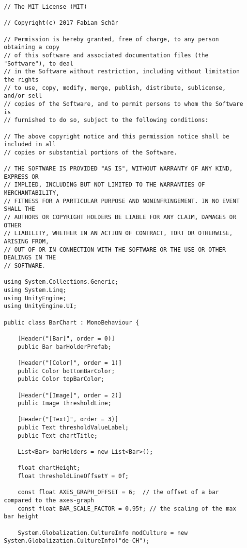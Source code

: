 \begin{lstlisting}[caption={/Assets/Scripts/Charts/BarChart.cs}, label={lst:scripts_charts_barchart}]
// The MIT License (MIT)

// Copyright(c) 2017 Fabian Schär

// Permission is hereby granted, free of charge, to any person obtaining a copy
// of this software and associated documentation files (the "Software"), to deal
// in the Software without restriction, including without limitation the rights
// to use, copy, modify, merge, publish, distribute, sublicense, and/or sell
// copies of the Software, and to permit persons to whom the Software is
// furnished to do so, subject to the following conditions:

// The above copyright notice and this permission notice shall be included in all
// copies or substantial portions of the Software.

// THE SOFTWARE IS PROVIDED "AS IS", WITHOUT WARRANTY OF ANY KIND, EXPRESS OR
// IMPLIED, INCLUDING BUT NOT LIMITED TO THE WARRANTIES OF MERCHANTABILITY,
// FITNESS FOR A PARTICULAR PURPOSE AND NONINFRINGEMENT. IN NO EVENT SHALL THE
// AUTHORS OR COPYRIGHT HOLDERS BE LIABLE FOR ANY CLAIM, DAMAGES OR OTHER
// LIABILITY, WHETHER IN AN ACTION OF CONTRACT, TORT OR OTHERWISE, ARISING FROM,
// OUT OF OR IN CONNECTION WITH THE SOFTWARE OR THE USE OR OTHER DEALINGS IN THE
// SOFTWARE.

using System.Collections.Generic;
using System.Linq;
using UnityEngine;
using UnityEngine.UI;

public class BarChart : MonoBehaviour {

	[Header("[Bar]", order = 0)]
	public Bar barHolderPrefab;
	
	[Header("[Color]", order = 1)]
	public Color bottomBarColor;
	public Color topBarColor;
	
	[Header("[Image]", order = 2)]
	public Image thresholdLine;
	
	[Header("[Text]", order = 3)]
	public Text thresholdValueLabel;
	public Text chartTitle;
	
	List<Bar> barHolders = new List<Bar>();
	
	float chartHeight;
	float thresholdLineOffsetY = 0f;
	
	const float AXES_GRAPH_OFFSET = 6;  // the offset of a bar compared to the axes-graph
	const float BAR_SCALE_FACTOR = 0.95f; // the scaling of the max bar height
	
	System.Globalization.CultureInfo modCulture = new System.Globalization.CultureInfo("de-CH");
	

\end{lstlisting}
